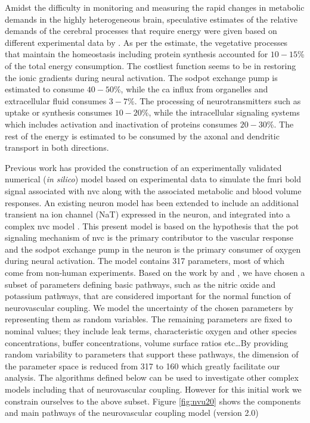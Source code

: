 Amidst the difficulty in monitoring and measuring the rapid changes in metabolic demands in the highly heterogeneous brain, speculative estimates of the relative demands of the cerebral processes that require energy were given based on different experimental data by \citet{Ames2000}. As per the estimate, the vegetative processes that maintain the homeostasis including protein synthesis accounted for $10-15$\% of the total energy consumption. The costliest function seems to be in  restoring the ionic gradients during neural activation. The \gls{sodpot} exchange pump is estimated to consume $40-50$\%, while the \gls{ca} influx from organelles and extracellular fluid consumes $3-7$\%. The processing of neurotransmitters such as uptake or synthesis consumes $10-20$\%, while the intracellular signaling systems which includes activation and inactivation of proteins consumes $20-30$\%. The rest of the energy is estimated to be consumed by the axonal and dendritic transport in both directions.

Previous work \cite{Mathias2018} has provided  the construction of an experimentally validated numerical (\textit{in silico}) model based on experimental data to simulate the \gls{fmri} \gls{bold} signal associated with \gls{nvc} along with the associated metabolic and blood volume responses. An existing neuron model \citep{Mathias2017, Mathias2017a} has been extended to include an additional transient \gls{na} ion channel (NaT) expressed in the neuron, and integrated into a complex \gls{nvc} model \citep{Dormanns2015, Dormanns2016, Kenny2017a}. This present model is based on the hypothesis that the \gls{pot} signaling mechanism of \gls{nvc} is the primary contributor to the vascular response and the \gls{sodpot} exchange pump in the neuron is the primary consumer of oxygen during neural activation. The model contains 317 parameters, most of which come from non-human experiments. Based on the work by \cite{Dormanns2016} and \cite{Kenny2018}, we have chosen a subset of parameters defining basic pathways, such as  the nitric oxide and potassium pathways,   that are considered important for the normal function of neurovascular coupling.  We model the uncertainty of the chosen parameters  by representing them as random variables. The remaining  parameters are fixed to nominal values; they include leak terms, characteristic oxygen and other species concentrations, buffer concentrations, volume surface ratios etc\dots By providing random variability to parameters that support these pathways, the dimension of the parameter space is reduced from 317 to 160 which greatly facilitate our analysis. The algorithms defined below can be used to investigate other complex models including that of neurovascular coupling. However for this initial work we constrain ourselves to the above subset. 
Figure \ref{fig:nvu20} shows the components and main pathways of the neurovascular coupling model (version 2.0) \\


